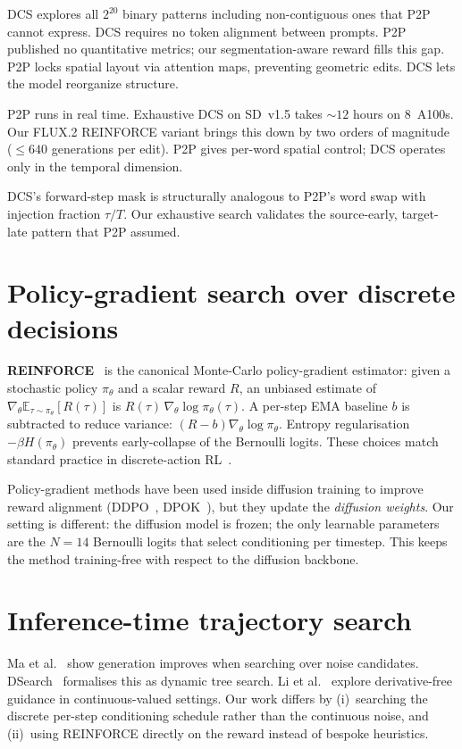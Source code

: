 DCS explores all $2^{20}$ binary patterns including non-contiguous ones that P2P cannot express. DCS requires no token alignment between prompts. P2P published no quantitative metrics; our segmentation-aware reward fills this gap. P2P locks spatial layout via attention maps, preventing geometric edits. DCS lets the model reorganize structure.

P2P runs in real time. Exhaustive DCS on SD~v1.5 takes ${\sim}12$ hours on 8~A100s. Our FLUX.2 REINFORCE variant brings this down by two orders of magnitude (${\le}640$ generations per edit). P2P gives per-word spatial control; DCS operates only in the temporal dimension.

DCS's forward-step mask is structurally analogous to P2P's word swap with injection fraction $\tau/T$. Our exhaustive search validates the source-early, target-late pattern that P2P assumed.

\section{Policy-gradient search over discrete decisions}
\label{sec:reinforce_lit}

\textbf{REINFORCE}~\cite{williams1992simple} is the canonical Monte-Carlo policy-gradient estimator: given a stochastic policy $\pi_\theta$ and a scalar reward $R$, an unbiased estimate of $\nabla_\theta \mathbb{E}_{\tau\sim\pi_\theta}[R(\tau)]$ is $R(\tau)\,\nabla_\theta \log \pi_\theta(\tau)$. A per-step EMA baseline $b$ is subtracted to reduce variance: $(R-b)\nabla_\theta \log \pi_\theta$. Entropy regularisation $-\beta H(\pi_\theta)$ prevents early-collapse of the Bernoulli logits. These choices match standard practice in discrete-action RL~\cite{sutton1999policy,mnih2016async}.

Policy-gradient methods have been used inside diffusion training to improve reward alignment (DDPO~\cite{black2023ddpo}, DPOK~\cite{fan2023dpok}), but they update the \emph{diffusion weights}. Our setting is different: the diffusion model is frozen; the only learnable parameters are the $N=14$ Bernoulli logits that select conditioning per timestep. This keeps the method training-free with respect to the diffusion backbone.

\section{Inference-time trajectory search}

Ma et al.~\cite{ma2025inference} show generation improves when searching over noise candidates. DSearch~\cite{li2025dynamic} formalises this as dynamic tree search. Li et al.~\cite{li2024derivative} explore derivative-free guidance in continuous-valued settings. Our work differs by (i)~searching the discrete per-step conditioning schedule rather than the continuous noise, and (ii)~using REINFORCE directly on the reward instead of bespoke heuristics.

